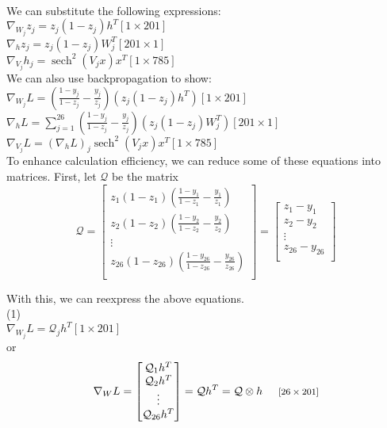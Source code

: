 \documentclass{report}
\DeclareMathOperator{\sech}{sech} %
\newcommand{\tab}{\-\hspace{0.5cm}}
\begin{document}
\-\\
We can substitute the following expressions:\\
\tab$\nabla_{W_j} z_j = z_j(1-z_j)h^T$\tab\footnotesize$[1\times201]$\normalsize\\
\tab$\nabla_{h} z_j = z_j(1-z_j)W_j^T$\tab\footnotesize$[201\times1]$\normalsize\\
\tab$\nabla_{V_j} h_j = \sech^2(V_jx)x^T $\tab\footnotesize$[1\times785]$\normalsize\\

We can also use backpropagation to show:\\
\tab$\nabla_{W_j} L = \left(\frac{1-y_j}{1-z_j} - \frac{y_j}{z_j}\right)\left(z_j(1-z_j) h^T\right)$\tab\footnotesize$[1\times201]$\normalsize\\
\tab$\nabla_{h} L = \sum_{j=1}^{26}{\left(\frac{1-y_j}{1-z_j} - \frac{y_j}{z_j}\right)\left(z_j(1-z_j)W_j^T\right)}$\tab\footnotesize$[201\times1]$\normalsize\\
\tab$\nabla_{V_j} L = \left(\nabla_{h} L\right)_j \sech^2(V_jx)x^T $\tab\footnotesize$[1\times785]$\normalsize\\

To enhance calculation efficiency, we can reduce some of these equations into matrices. First, let $\mathcal{Q}$ be the matrix
$$\mathcal{Q} = \begin{bmatrix}
z_1(1-z_1)\left(\frac{1-y_1}{1-z_1} - \frac{y_1}{z_1}\right)\\
z_2(1-z_2)\left(\frac{1-y_2}{1-z_2} - \frac{y_2}{z_2}\right)\\
\vdots \\
z_{26}(1-z_{26})\left(\frac{1-y_{26}}{1-z_{26}} - \frac{y_{26}}{z_{26}}\right)\\
\end{bmatrix} = \begin{bmatrix}
z_1 - y_1\\
z_2 - y_2 \\
\vdots \\
z_{26} - y_{26} \\
\end{bmatrix}$$

With this, we can reexpress the above equations.\\
(1) \\
\tab$\nabla_{W_j} L = \mathcal{Q}_j h^T $\tab\footnotesize$[1\times201]$\normalsize\\
\tab or
$$ \nabla_{W} L = \begin{bmatrix}
\mathcal{Q}_1 h^T \\
\mathcal{Q}_2 h^T \\
\vdots \\
\mathcal{Q}_{26} h^T \\
\end{bmatrix} = \mathcal{Q}h^T = \mathcal{Q} \otimes h \text{\tab\footnotesize$[26\times201]$\normalsize} $$
\end{document}
